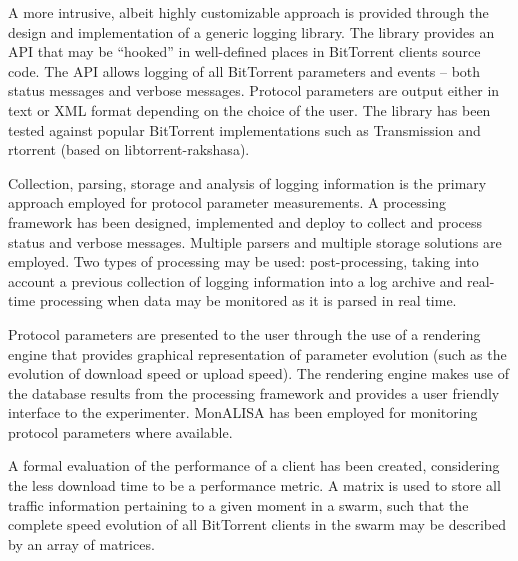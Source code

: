 A more intrusive, albeit highly customizable approach is provided through the
design and implementation of a generic logging library. The library provides
an API that may be ``hooked'' in well-defined places in BitTorrent clients
source code. The API allows logging of all BitTorrent parameters and events --
both status messages and verbose messages. Protocol parameters are output
either in text or XML format depending on the choice of the user. The library
has been tested against popular BitTorrent implementations such as
Transmission and rtorrent (based on libtorrent-rakshasa).

Collection, parsing, storage and analysis of logging information is the
primary approach employed for protocol parameter measurements. A processing
framework has been designed, implemented and deploy to collect and process
status and verbose messages. Multiple parsers and multiple storage solutions
are employed. Two types of processing may be used: post-processing, taking
into account a previous collection of logging information into a log archive
and real-time processing when data may be monitored as it is parsed in
real time.

Protocol parameters are presented to the user through the use of a rendering
engine that provides graphical representation of parameter evolution (such as
the evolution of download speed or upload speed). The rendering engine makes
use of the database results from the processing framework and provides a user
friendly interface to the experimenter. MonALISA has been employed for
monitoring protocol parameters where available.

A formal evaluation of the performance of a client has been created,
considering the less download time to be a performance metric. A matrix is
used to store all traffic information pertaining to a given moment in a swarm,
such that the complete speed evolution of all BitTorrent clients in the swarm
may be described by an array of matrices.
